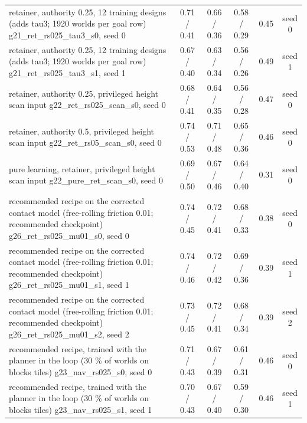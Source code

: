 \begin{table}[t]
{\begin{tabular}{lccccc}
retainer, authority 0.25, 12 training designs (adds tau3; 1920 worlds per goal row) g21\_ret\_rs025\_tau3\_s0, seed 0 & 0.71 / 0.41 & 0.66 / 0.36 & 0.58 / 0.29 & 0.45 & seed 0\\
retainer, authority 0.25, 12 training designs (adds tau3; 1920 worlds per goal row) g21\_ret\_rs025\_tau3\_s1, seed 1 & 0.67 / 0.40 & 0.63 / 0.34 & 0.56 / 0.26 & 0.49 & seed 1\\
retainer, authority 0.25, privileged height scan input g22\_ret\_rs025\_scan\_s0, seed 0 & 0.68 / 0.41 & 0.64 / 0.35 & 0.56 / 0.28 & 0.47 & seed 0\\
retainer, authority 0.5, privileged height scan input g22\_ret\_rs05\_scan\_s0, seed 0 & 0.74 / 0.53 & 0.71 / 0.48 & 0.65 / 0.36 & 0.46 & seed 0\\
pure learning, retainer, privileged height scan input g22\_pure\_ret\_scan\_s0, seed 0 & 0.69 / 0.50 & 0.67 / 0.46 & 0.64 / 0.40 & 0.31 & seed 0\\
recommended recipe on the corrected contact model (free-rolling friction 0.01; recommended checkpoint) g26\_ret\_rs025\_mu01\_s0, seed 0 & 0.74 / 0.45 & 0.72 / 0.41 & 0.68 / 0.33 & 0.38 & seed 0\\
recommended recipe on the corrected contact model (free-rolling friction 0.01; recommended checkpoint) g26\_ret\_rs025\_mu01\_s1, seed 1 & 0.74 / 0.46 & 0.72 / 0.42 & 0.69 / 0.36 & 0.39 & seed 1\\
recommended recipe on the corrected contact model (free-rolling friction 0.01; recommended checkpoint) g26\_ret\_rs025\_mu01\_s2, seed 2 & 0.73 / 0.45 & 0.72 / 0.41 & 0.68 / 0.34 & 0.39 & seed 2\\
recommended recipe, trained with the planner in the loop (30 \% of worlds on blocks tiles) g23\_nav\_rs025\_s0, seed 0 & 0.71 / 0.43 & 0.67 / 0.39 & 0.61 / 0.31 & 0.46 & seed 0\\
recommended recipe, trained with the planner in the loop (30 \% of worlds on blocks tiles) g23\_nav\_rs025\_s1, seed 1 & 0.70 / 0.43 & 0.67 / 0.40 & 0.59 / 0.30 & 0.46 & seed 1\\
\bottomrule\end{tabular}}
\end{table}
